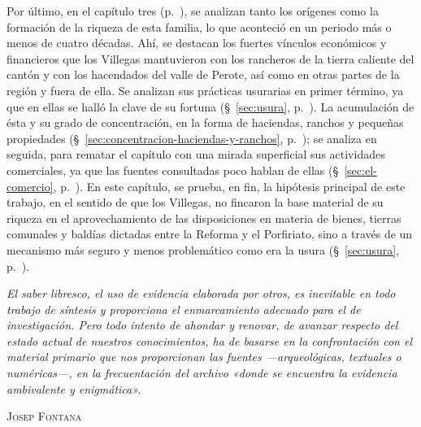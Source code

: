 \documentclass[14pt,twoside,final]{extbook} %
\begin{document}
Por último, en el capítulo tres (p.~\pageref{ch:capitulo-tres}), se analizan tanto los orígenes como la formación de la riqueza de esta familia, lo que aconteció en un periodo más o menos de cuatro décadas. Ahí, se destacan los fuertes vínculos económicos y financieros que los Villegas mantuvieron con los rancheros de la tierra caliente del cantón y con los hacendados del valle de Perote, así como en otras partes de la región y fuera de ella. Se analizan sus prácticas usurarias en primer término, ya que en ellas se halló la clave de su fortuna (\S~\ref{sec:usura}, p.~\pageref{sec:usura}). La acumulación de ésta y su grado de concentración, en la forma de haciendas, ranchos y pequeñas propiedades (\S~\ref{sec:concentracion-haciendas-y-ranchos}, p.~\pageref{sec:concentracion-haciendas-y-ranchos}); se analiza en seguida, para rematar el capítulo con una mirada superficial sus actividades comerciales, ya que las fuentes consultadas poco hablan de ellas (\S~\ref{sec:el-comercio}, p.~\pageref{sec:el-comercio}). En este capítulo, se prueba, en fin, la hipótesis principal de este trabajo, en el sentido de que los Villegas, no fincaron la base material de su riqueza en el aprovechamiento de las disposiciones en materia de bienes, tierras comunales y baldías dictadas entre la Reforma y el Porfiriato, sino a través de un mecanismo más seguro y menos problemático como era la usura (\S~\ref{sec:usura}, p.~\pageref{sec:usura}).
\newpage
\pagestyle{empty}
\null\vfill
\newpage
\pagestyle{empty}
\begin{flushright}
\begin{minipage}{8cm}
\emph{El saber libresco, el uso de evidencia elaborada por otros, es inevitable en todo trabajo de síntesis y proporciona el enmarcamiento adecuado para el de investigación. Pero todo intento de ahondar y renovar, de avanzar respecto del estado actual de nuestros conocimientos, ha de basarse en la confrontación con el material primario que nos proporcionan las fuentes ---arqueológicas, textuales o numéricas---, en la frecuentación del archivo «donde se encuentra la evidencia ambivalente y enigmática».}
\end{minipage}
\end{flushright}
\begin{flushright}
\textsc{Josep Fontana}
\end{flushright}
\end{document}
